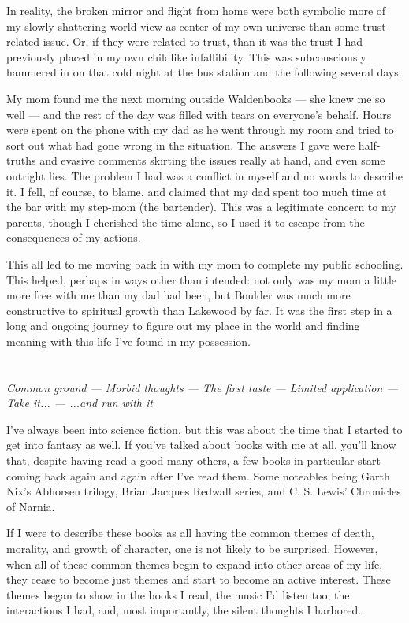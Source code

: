\documentclass{book}
\begin{document}
In reality, the broken mirror and flight from home were both symbolic more of my slowly shattering world-view as center of my own universe than some trust related issue.  Or, if they were related to trust, than it was the trust I had previously placed in my own childlike infallibility.  This was subconsciously hammered in on that cold night at the bus station and the following several days.

My mom found me the next morning outside Waldenbooks --- she knew me so well --- and the rest of the day was filled with tears on everyone's behalf.  Hours were spent on the phone with my dad as he went through my room and tried to sort out what had gone wrong in the situation.  The answers I gave were half-truths and evasive comments skirting the issues really at hand, and even some outright lies.  The problem I had was a conflict in myself and no words to describe it.  I fell, of course, to blame, and claimed that my dad spent too much time at the bar with my step-mom (the bartender).  This was a legitimate concern to my parents, though I cherished the time alone, so I used it to escape from the consequences of my actions.

This all led to me moving back in with my mom to complete my public schooling.  This helped, perhaps in ways other than intended: not only was my mom a little more free with me than my dad had been, but Boulder was much more constructive to spiritual growth than Lakewood by far.  It was the first step in a long and ongoing journey to figure out my place in the world and finding meaning with this life I've found in my possession.

\chapter{}
\begin{center}
	\emph{Common ground --- Morbid thoughts --- The first taste --- Limited application --- Take it...  --- ...and run with it}
\end{center}

I've always been into science fiction, but this was about the time that I started to get into fantasy as well.  If you've talked about books with me at all, you'll know that, despite having read a good many others, a few books in particular start coming back again and again after I've read them.  Some noteables being Garth Nix's Abhorsen trilogy, Brian Jacques Redwall series, and C.  S.  Lewis' Chronicles of Narnia.

If I were to describe these books as all having the common themes of death, morality, and growth of character, one is not likely to be surprised.  However, when all of these common themes begin to expand into other areas of my life, they cease to become just themes and start to become an active interest.  These themes began to show in the books I read, the music I'd listen too, the interactions I had, and, most importantly, the silent thoughts I harbored.
\end{document}
